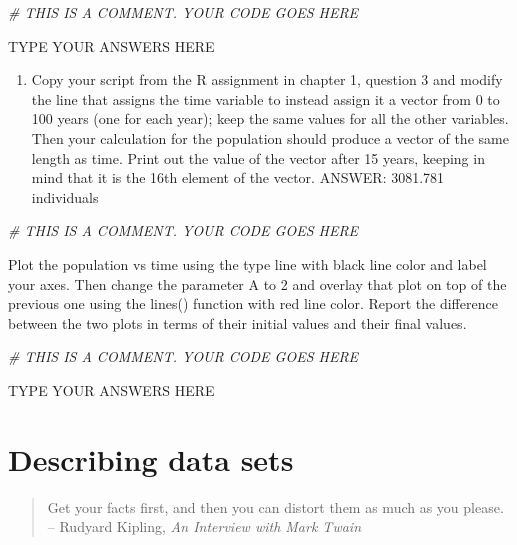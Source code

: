 \documentclass[
]{book}
\newenvironment{Shaded}{\begin{snugshade}}{\end{snugshade}}
\newcommand{\CommentTok}[1]{\textcolor[rgb]{0.56,0.35,0.01}{\textit{#1}}}
\providecommand{\tightlist}{%
  \setlength{\itemsep}{0pt}\setlength{\parskip}{0pt}}
\theoremstyle{definition}
\theoremstyle{definition}
\theoremstyle{definition}
\theoremstyle{remark}
\begin{document}
\begin{Shaded}
\begin{Highlighting}[]
\CommentTok{\# THIS IS A COMMENT. YOUR CODE GOES HERE }
\end{Highlighting}
\end{Shaded}

TYPE YOUR ANSWERS HERE

\begin{enumerate}
\def\labelenumi{\arabic{enumi}.}
\setcounter{enumi}{2}
\tightlist
\item
  Copy your script from the R assignment in chapter 1, question 3 and modify the line that assigns the time variable to instead assign it a vector from 0 to 100 years (one for each year); keep the same values for all the other variables. Then your calculation for the population should produce a vector of the same length as time. Print out the value of the vector after 15 years, keeping in mind that it is the 16th element of the vector. ANSWER: 3081.781 individuals
\end{enumerate}

\begin{Shaded}
\begin{Highlighting}[]
\CommentTok{\# THIS IS A COMMENT. YOUR CODE GOES HERE }
\end{Highlighting}
\end{Shaded}

Plot the population vs time using the type line with black line color and label your axes. Then change the parameter A to 2 and overlay that plot on top of the previous one using the lines() function with red line color. Report the difference between the two plots in terms of their initial values and their final values.

\begin{Shaded}
\begin{Highlighting}[]
\CommentTok{\# THIS IS A COMMENT. YOUR CODE GOES HERE }
\end{Highlighting}
\end{Shaded}

TYPE YOUR ANSWERS HERE

\hypertarget{describing-data-sets}{%
\chapter{Describing data sets}\label{describing-data-sets}}

\begin{quote}
Get your facts first, and then you can distort them as much as you please.\\
-- Rudyard Kipling, \emph{An Interview with Mark Twain}
\end{quote}
\end{document}
